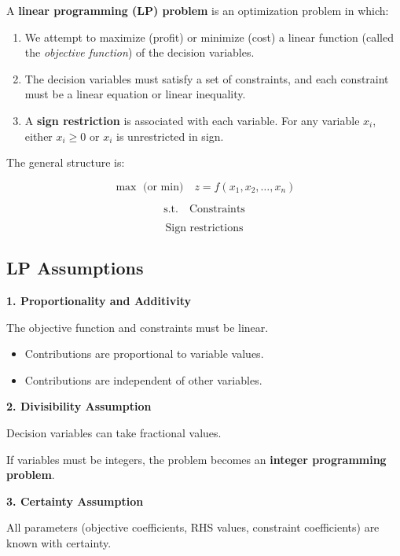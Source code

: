\begin{Def}
A \textbf{linear programming (LP) problem} is an optimization problem in which:

\begin{enumerate}
\item We attempt to maximize (profit) or minimize (cost) a linear function
(called the \textit{objective function}) of the decision variables.

\item The decision variables must satisfy a set of constraints, and each
constraint must be a linear equation or linear inequality.

\item A \textbf{sign restriction} is associated with each variable.
For any variable $x_i$, either $x_i \ge 0$ or $x_i$ is unrestricted in sign.
\end{enumerate}

The general structure is:

\[\max \text{ (or min)} \quad z=f(x_1,x_2,\ldots,x_n)\]

\[
\text{s.t.} \quad \text{Constraints}
\]

\[
\text{Sign restrictions}
\]
\end{Def}


\subsection*{LP Assumptions}

\textbf{1. Proportionality and Additivity}

The objective function and constraints must be linear.

\begin{itemize}
\item Contributions are proportional to variable values.
\item Contributions are independent of other variables.
\end{itemize}

\textbf{2. Divisibility Assumption}

Decision variables can take fractional values.

If variables must be integers, the problem becomes an
\textbf{integer programming problem}.

\textbf{3. Certainty Assumption}

All parameters (objective coefficients, RHS values, constraint coefficients)
are known with certainty.


